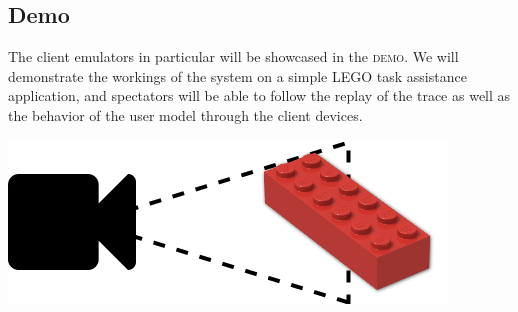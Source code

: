 \documentclass[portrait, a1]{KTHEEposter}
\begin{document}
\begin{pcolumns}[3]
\begin{pcolumn}[3]
\begin{pframe}[.67]
                \section{Demo}
                The client emulators in particular will be showcased in the \textsc{demo}.
                We will demonstrate the workings of the system on a simple LEGO task assistance application, and spectators will be able to follow the replay of the trace as well as the behavior of the user model through the client devices.
                \medskip
                \begin{center}
                    \includegraphics[width=.5\textwidth]{img/lego}%
                \end{center}
            \end{pframe}    
        \end{pcolumn}%
        \begin{pcolumn}[3]
            \begin{pframe}[2.14]

\end{pframe}
\end{pcolumn}
\end{pcolumns}
\end{document}

